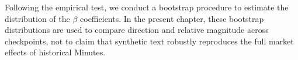 






Following the empirical test, we conduct a bootstrap procedure to estimate the distribution of the $\beta$ coefficients. In the present chapter, these bootstrap distributions are used to compare direction and relative magnitude across checkpoints, not to claim that synthetic text robustly reproduces the full market effects of historical Minutes.







